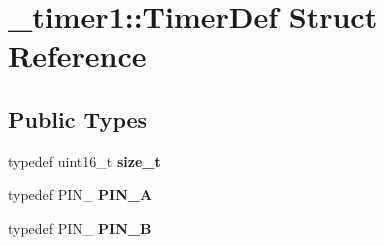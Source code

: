 \hypertarget{struct__timer1_1_1TimerDef}{}\section{\+\_\+timer1\+:\+:Timer\+Def Struct Reference}
\label{struct__timer1_1_1TimerDef}
\subsection*{Public Types}
\begin{DoxyCompactItemize}
\item 
\hypertarget{struct__timer1_1_1TimerDef_ab1eff69c17b23ae20403b94c8a286e27}{}\label{struct__timer1_1_1TimerDef_ab1eff69c17b23ae20403b94c8a286e27} 
typedef uint16\+\_\+t {\bfseries size\+\_\+t}
\item 
\hypertarget{struct__timer1_1_1TimerDef_a6b8de889a9e10b6889f751db480fb92e}{}\label{struct__timer1_1_1TimerDef_a6b8de889a9e10b6889f751db480fb92e} 
typedef P\+I\+N\+\_ {\bfseries P\+I\+N\+\_\+A}
\item 
\hypertarget{struct__timer1_1_1TimerDef_adb1333d11a42c46fe8aeb8e9a85dad7f}{}\label{struct__timer1_1_1TimerDef_adb1333d11a42c46fe8aeb8e9a85dad7f} 
typedef P\+I\+N\+\_ {\bfseries P\+I\+N\+\_\+B}
\end{DoxyCompactItemize}
